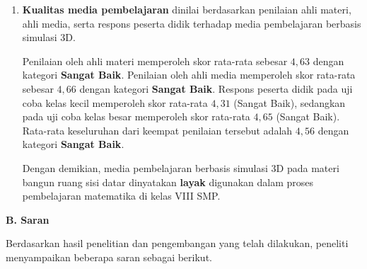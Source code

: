 \begin{enumerate}
    \hspace*{1cm}Pada tahap evaluasi, peneliti menganalisis data dari angket ahli materi, ahli media, dan respons peserta didik, kemudian melakukan revisi akhir berdasarkan masukan yang diperoleh.

    \item \textbf{Kualitas media pembelajaran} dinilai berdasarkan penilaian ahli materi, ahli media, serta respons peserta didik terhadap media pembelajaran berbasis simulasi 3D.
    
    \hspace*{1cm}Penilaian oleh ahli materi memperoleh skor rata-rata sebesar \(4,63\) dengan kategori \textbf{Sangat Baik}. Penilaian oleh ahli media memperoleh skor rata-rata sebesar \(4,66\) dengan kategori \textbf{Sangat Baik}. Respons peserta didik pada uji coba kelas kecil memperoleh skor rata-rata \(4,31\) (Sangat Baik), sedangkan pada uji coba kelas besar memperoleh skor rata-rata \(4,65\) (Sangat Baik). Rata-rata keseluruhan dari keempat penilaian tersebut adalah \(4,56\) dengan kategori \textbf{Sangat Baik}.
    
    \hspace*{1cm}Dengan demikian, media pembelajaran berbasis simulasi 3D pada materi bangun ruang sisi datar dinyatakan \textbf{layak} digunakan dalam proses pembelajaran matematika di kelas VIII SMP.
\end{enumerate}

\textbf{B. Saran}

\hspace*{1cm}Berdasarkan hasil penelitian dan pengembangan yang telah dilakukan, peneliti menyampaikan beberapa saran sebagai berikut.

